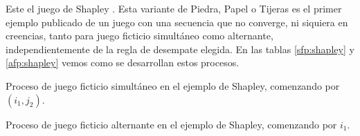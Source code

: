 

Este el juego de Shapley \cite{shapley:3x3}. Esta variante de Piedra, Papel o Tijeras es el primer ejemplo publicado de un juego con una secuencia que no converge, ni siquiera en creencias, tanto para juego ficticio simultáneo como alternante, independientemente de la regla de desempate elegida. En las tablas \ref{sfp:shapley} y \ref{afp:shapley} vemos como se desarrollan estos procesos.


\begin{table} %
    \centering
    
    \caption{Proceso de juego ficticio simultáneo en el ejemplo de Shapley, comenzando por $(i_1, j_2)$.}
    \label{sfp:shapley}
\end{table}
\begin{table} %
    \centering
    
    \caption{Proceso de juego ficticio alternante en el ejemplo de Shapley, comenzando por $i_1$.}
    \label{afp:shapley}
\end{table}

